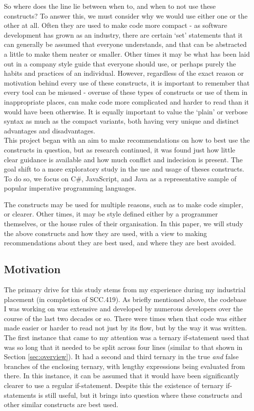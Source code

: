 \documentclass{article}
\begin{document}
        So where does the line lie between when to, and when to not use these constructs? To answer this, we must consider why we would use either one or the other at all. Often they are used to make code more compact - as software development has grown as an industry, there are certain `set' statements that it can generally be assumed that everyone understands, and that can be abstracted a little to make them neater or smaller. Other times it may be what has been laid out in a company style guide that everyone should use, or perhaps purely the habits and practices of an individual. However, regardless of the exact reason or motivation behind every use of these constructs, it is important to remember that every tool can be misused - overuse of these types of constructs or use of them in inappropriate places, can make code more complicated and harder to read than it would have been otherwise. It is equally important to value the `plain' or verbose syntax as much as the compact variants, both having very unique and distinct advantages and disadvantages.
        \\

        This project began with an aim to make recommendations on how to best use the constructs in question, but as research continued, it was found just how little clear guidance is available and how much conflict and indecision is present. The goal shift to a more exploratory study in the use and usage of theses constructs. To do so, we focus on C\#, JavaScript, and Java as a representative sample of popular imperative programming languages.

        The constructs may be used for multiple reasons, such as to make code simpler, or clearer. Other times, it may be style defined either by a programmer themselves, or the house rules of their organisation.  In this paper, we will study the above constructs and how they are used, with a view to making recommendations about they are best used, and where they are best avoided.
    \subsection{Motivation}
        The primary drive for this study stems from my experience during my industrial placement (in completion of SCC.419). As briefly mentioned above, the codebase I was working on was extensive and developed by numerous developers over the course of the last two decades or so. There were times when that code was either made easier or harder to read not just by its flow, but by the way it was written. The first instance that came to my attention was a ternary if-statement used that was so long that it needed to be split across four lines (similar to that shown in Section \ref{sec:overview}). It had a second and third ternary in the true \emph{and} false branches of the enclosing ternary, with lengthy expressions being evaluated from there. In this instance, it can be assumed that it would have been significantly clearer to use a regular if-statement. Despite this the existence of ternary if-statements is still useful, but it brings into question where these constructs and other similar constructs are best used.
\end{document}
